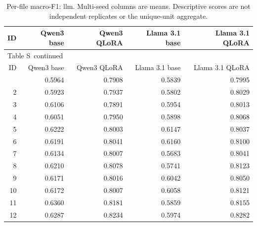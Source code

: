 \documentclass[10pt,a4paper]{article}
\renewcommand{\thetable}{S\arabic{table}}
\begin{document}
{\footnotesize
\setlength{\tabcolsep}{4pt}
\begin{longtable}{@{}rrrrr@{}}
\caption{Per-file macro-F1: llm. Multi-seed columns are means. Descriptive scores are not independent replicates or the unique-unit aggregate.}\label{sup:legacy-llm}\\
\toprule
ID & Qwen3 base & Qwen3 QLoRA & Llama 3.1 base & Llama 3.1 QLoRA \\
\midrule\endfirsthead
\multicolumn{5}{l}{\small Table \thetable\ continued}\\
\toprule
ID & Qwen3 base & Qwen3 QLoRA & Llama 3.1 base & Llama 3.1 QLoRA \\
\midrule\endhead
\bottomrule\endfoot
1 & 0.5964 & 0.7908 & 0.5839 & 0.7995 \\
2 & 0.5923 & 0.7937 & 0.5802 & 0.8029 \\
3 & 0.6106 & 0.7891 & 0.5954 & 0.8013 \\
4 & 0.6051 & 0.7950 & 0.5898 & 0.8068 \\
5 & 0.6222 & 0.8003 & 0.6147 & 0.8037 \\
6 & 0.6191 & 0.8041 & 0.6160 & 0.8100 \\
7 & 0.6134 & 0.8007 & 0.5683 & 0.8041 \\
8 & 0.6210 & 0.8078 & 0.5741 & 0.8123 \\
9 & 0.6171 & 0.8016 & 0.6042 & 0.8050 \\
10 & 0.6172 & 0.8007 & 0.6058 & 0.8121 \\
11 & 0.6360 & 0.8181 & 0.5859 & 0.8155 \\
12 & 0.6287 & 0.8234 & 0.5974 & 0.8282 \\
\end{longtable}
}
\end{document}
